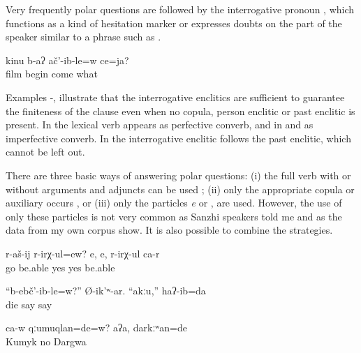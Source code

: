 Very frequently polar questions are followed by the interrogative pronoun  , which functions as a kind of hesitation marker or expresses doubts on the part of the speaker similar to a phrase such as .
%
\begin{exe}
	\ex	\label{ex:‎‎‎Did the movie start or what}
	\gll	kinu	b-aʔ	ač'-ib-le=w	ce=ja?	\\
		film	begin	come	what\\
	\glt	{}
\end{exe}

Examples -,  illustrate that the interrogative enclitics are sufficient to guarantee the finiteness of the clause even when no copula, person enclitic or past enclitic is present. In  the lexical verb appears as perfective converb, and in  and  as imperfective converb. In  the interrogative enclitic follows the past enclitic, which cannot be left out. 

There are three basic ways of answering polar questions: (i) the full verb with or without arguments and adjuncts can be used ; (ii) only the appropriate copula or auxiliary occurs , or (iii) only the particles \textit{e}  or ,   are used. However, the use of only these particles is not very common as Sanzhi speakers told me and as the data from my own corpus show. It is also possible to combine the strategies.
%
\begin{exe}

	\ex	\label{ex:‎Is she able to walk}
	\gll	r-aš-ij	r-irχ-ul=ew? e,	e,	r-irχ-ul	ca-r\\
		go	be.able yes	yes	be.able	\\
	\glt	{}

	\ex	\label{ex:Did (the cow) die? he asked. No, I said}
	\gll	``b-ebč'-ib-le=w?'' Ø-ik'ʷ-ar.	``akːu,''	haʔ-ib=da\\
		die	say  say\\
	\glt	{}
	
	\ex	\label{ex:Was he himself Kumyk? No, Dargi}
	\gll	ca-w	qːumuqlan=de=w?	aʔa,	darkːʷan=de\\
			Kumyk 	no	Dargwa\\
	\glt	{}
\end{exe}


